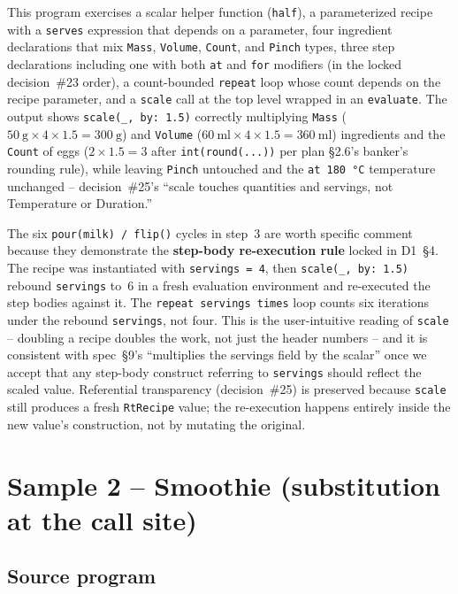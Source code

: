 \documentclass[11pt,a4paper]{article}
\begin{document}
This program exercises a scalar helper function (\texttt{half}), a
parameterized recipe with a \texttt{serves} expression that depends on
a parameter, four ingredient declarations that mix \texttt{Mass},
\texttt{Volume}, \texttt{Count}, and \texttt{Pinch} types, three step
declarations including one with both \texttt{at} and \texttt{for}
modifiers (in the locked decision~\#23 order), a count-bounded
\texttt{repeat} loop whose count depends on the recipe parameter, and a
\texttt{scale} call at the top level wrapped in an \texttt{evaluate}.
The output shows \texttt{scale(\_, by:~1.5)} correctly multiplying
\texttt{Mass} ($50~\text{g} \times 4 \times 1.5 = 300~\text{g}$) and
\texttt{Volume} ($60~\text{ml} \times 4 \times 1.5 = 360~\text{ml}$)
ingredients and the \texttt{Count} of eggs ($2 \times 1.5 = 3$ after
\texttt{int(round(...))} per plan \S2.6's banker's rounding rule),
while leaving \texttt{Pinch} untouched and the \texttt{at 180~°C}
temperature unchanged -- decision~\#25's ``scale touches quantities
and servings, not Temperature or Duration.''

The six \texttt{pour(milk) / flip()} cycles in step~3 are worth
specific comment because they demonstrate the \textbf{step-body
re-execution rule} locked in D1~\S4. The recipe was instantiated with
\texttt{servings = 4}, then \texttt{scale(\_, by:~1.5)} rebound
\texttt{servings} to~6 in a fresh evaluation environment and
re-executed the step bodies against it. The \texttt{repeat servings
times} loop counts six iterations under the rebound \texttt{servings},
not four. This is the user-intuitive reading of \texttt{scale} --
doubling a recipe doubles the work, not just the header numbers -- and
it is consistent with spec~\S9's ``multiplies the servings field by
the scalar'' once we accept that any step-body construct referring to
\texttt{servings} should reflect the scaled value. Referential
transparency (decision~\#25) is preserved because \texttt{scale} still
produces a fresh \texttt{RtRecipe} value; the re-execution happens
entirely inside the new value's construction, not by mutating the
original.


\section{Sample 2 -- Smoothie (substitution at the call site)}

\subsection*{Source program}
\end{document}
